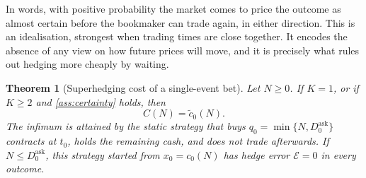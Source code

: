\documentclass[11pt,a4paper]{article}
\theoremstyle{plain}
\newtheorem{theorem}{Theorem}[section]
\theoremstyle{definition}
\theoremstyle{remark}
\newcommand{\1}{\mathbf{1}}
\begin{document}
In words, with positive probability the market comes to price the outcome as almost certain before the bookmaker can trade again, in either direction. This is an idealisation, strongest when trading times are close together. It encodes the absence of any view on how future prices will move, and it is precisely what rules out hedging more cheaply by waiting.

\begin{theorem}[Superhedging cost of a single-event bet]
\label{thm:single}
Let $N\geq 0$. If $K=1$, or if $K\geq 2$ and \cref{ass:certainty} holds, then
\[
C(N) = \tilde c_0(N).
\]
The infimum is attained by the static strategy that buys $q_0 = \min\{N, D^{\mathrm{ask}}_0\}$ contracts at $t_0$, holds the remaining cash, and does not trade afterwards. If $N\leq D^{\mathrm{ask}}_0$, this strategy started from $x_0 = c_0(N)$ has hedge error $\mathcal{E}=0$ in every outcome.
\end{theorem}
\end{document}
